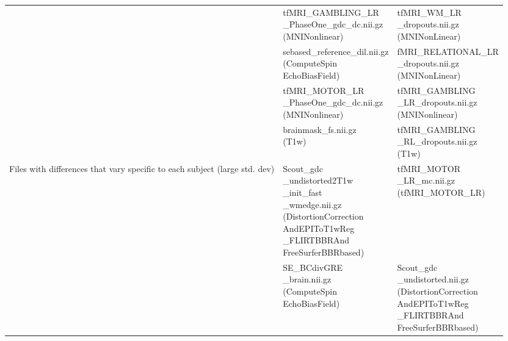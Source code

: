 \begin{center}
\begin{longtable}{|p{}|p{}|p{}|}
& \makecell[l]{tfMRI\_GAMBLING\_LR\\\_PhaseOne\_gdc\_dc.nii.gz\\(MNINonlinear)}                       & \makecell[l]{tfMRI\_WM\_LR\\\_dropouts.nii.gz\\(MNINonLinear)} \\\cline{2-3}
& \makecell[l]{sebased\_reference\_dil.nii.gz\\(ComputeSpin\\EchoBiasField)}                           & \makecell[l]{fMRI\_RELATIONAL\_LR\\\_dropouts.nii.gz\\(MNINonLinear)} \\\cline{2-3}
& \makecell[l]{tfMRI\_MOTOR\_LR\\\_PhaseOne\_gdc\_dc.nii.gz\\(MNINonlinear)}                      & \makecell[l]{tfMRI\_GAMBLING\\\_LR\_dropouts.nii.gz\\(MNINonlinear)} \\\cline{2-3}
& \makecell[l]{brainmask\_fs.nii.gz\\(T1w)}  & \makecell[l]{tfMRI\_GAMBLING\\\_RL\_dropouts.nii.gz\\(T1w)} \\\cline{1-3}
\multirow{5}{.3\textwidth}{Files with differences that vary specific to each subject (large std. dev)}   & \makecell[l]{Scout\_gdc\\\_undistorted2T1w\\\_init\_fast\\\_wmedge.nii.gz\\(DistortionCorrection\\AndEPIToT1wReg\\\_FLIRTBBRAnd\\FreeSurferBBRbased)}  & \makecell[l]{tfMRI\_MOTOR\\\_LR\_mc.nii.gz\\(tfMRI\_MOTOR\_LR)} \\\cline{2-3}
& \makecell[l]{SE\_BCdivGRE\\\_brain.nii.gz\\(ComputeSpin\\EchoBiasField)}                            & \makecell[l]{Scout\_gdc\\\_undistorted.nii.gz\\(DistortionCorrection\\AndEPIToT1wReg\\\_FLIRTBBRAnd\\FreeSurferBBRbased)} \\\cline{2-3}

\end{longtable}
\end{center}
